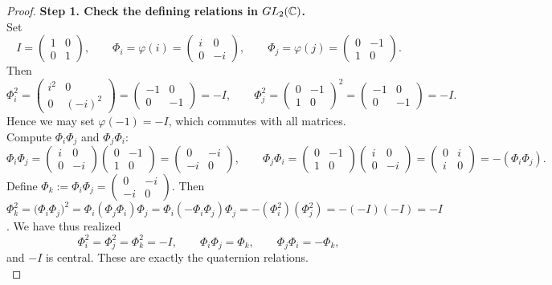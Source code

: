 \documentclass[12pt]{article}
\theoremstyle{definition}
\begin{document}
\begin{proof}
\noindent\textbf{Step 1. Check the defining relations in $GL_2(\Bbb C)$.}\\
\noindent Set
\[
I=\begin{pmatrix}1&0\\[2pt]0&1\end{pmatrix},\qquad
\Phi_i=\varphi(i)=\begin{pmatrix}i&0\\[2pt]0&-i\end{pmatrix},\qquad
\Phi_j=\varphi(j)=\begin{pmatrix}0&-1\\[2pt]1&0\end{pmatrix}.
\]
Then
\[
\Phi_i^2=
\begin{pmatrix}i^2&0\\[2pt]0&(-i)^2\end{pmatrix}
=\begin{pmatrix}-1&0\\[2pt]0&-1\end{pmatrix}
=-I,\qquad
\Phi_j^2=
\begin{pmatrix}0&-1\\[2pt]1&0\end{pmatrix}^2
=\begin{pmatrix}-1&0\\[2pt]0&-1\end{pmatrix}
=-I.
\]
Hence we may set $\varphi(-1)=-I$, which commutes with all matrices.\\

\noindent Compute $\Phi_i\Phi_j$ and $\Phi_j\Phi_i$:
\[
\Phi_i\Phi_j=
\begin{pmatrix}i&0\\[2pt]0&-i\end{pmatrix}
\begin{pmatrix}0&-1\\[2pt]1&0\end{pmatrix}
=
\begin{pmatrix}
0&-i\\[2pt]-i&0
\end{pmatrix},\qquad
\Phi_j\Phi_i=
\begin{pmatrix}0&-1\\[2pt]1&0\end{pmatrix}
\begin{pmatrix}i&0\\[2pt]0&-i\end{pmatrix}
=
\begin{pmatrix}
0&i\\[2pt]i&0
\end{pmatrix}
=-(\Phi_i\Phi_j).
\]
Define $\Phi_k:=\Phi_i\Phi_j=\begin{pmatrix}0&-i\\[2pt]-i&0\end{pmatrix}$.  
Then $\Phi_k^2=\big(\Phi_i\Phi_j\big)^2=\Phi_i(\Phi_j\Phi_i)\Phi_j=\Phi_i(-\Phi_i\Phi_j)\Phi_j=-(\Phi_i^2)(\Phi_j^2)= -(-I)(-I)=-I$.  
We have thus realized
\[
\Phi_i^2=\Phi_j^2=\Phi_k^2=-I,\qquad
\Phi_i\Phi_j=\Phi_k,\qquad
\Phi_j\Phi_i=-\Phi_k,
\]
and $-I$ is central. These are exactly the quaternion relations.\\


\end{proof}
\end{document}

